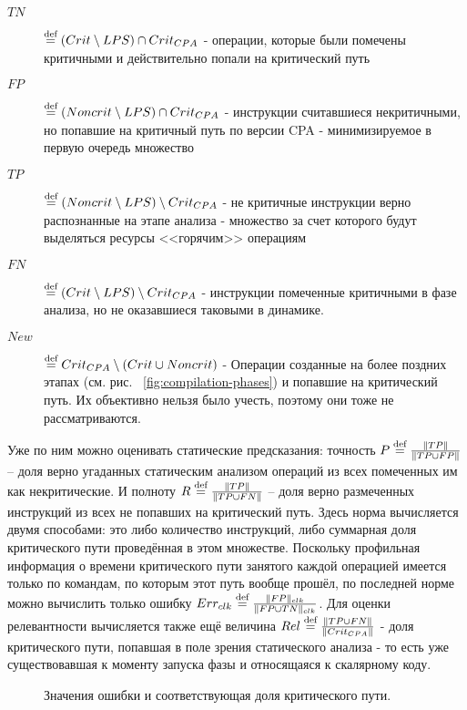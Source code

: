 \documentclass[a4paper,12pt,titlepage]{article}
\newcommand*{\fig}[1]{рис. ~{\ref{fig:#1}}}
\begin{document}
\begin{description}
	\item[$TN$] $\stackrel{\text{def}}{=} (Crit\setminus LPS)\cap Crit_{CPA}$ - операции, которые были помечены критичными и действительно попали на критический путь
	\item[$FP$] $\stackrel{\text{def}}{=} (Noncrit\setminus LPS)\cap Crit_{CPA}$ - инструкции считавшиеся некритичными, но попавшие на критичный путь по версии CPA - минимизируемое в первую очередь множество
	\item[$TP$] $\stackrel{\text{def}}{=} (Noncrit\setminus LPS)\setminus Crit_{CPA}$ - не критичные инструкции верно распознанные на этапе анализа - множество за счет которого будут выделяться ресурсы <<горячим>> операциям
	\item[$FN$] $\stackrel{\text{def}}{=} (Crit\setminus LPS)\setminus Crit_{CPA}$ - инструкции помеченные критичными в фазе анализа, но не оказавшиеся таковыми в динамике.
	\item[$New$] $\stackrel{\text{def}}{=} Crit_{CPA}\setminus (Crit \cup Noncrit)$ - Операции созданные на более поздних этапах (см. \fig{compilation-phases}) и попавшие на критический путь. Их объективно нельзя было учесть, поэтому они тоже не рассматриваются.
\end{description}
Уже по ним можно оценивать статические предсказания: точность $P\stackrel{\text{def}}{=}\frac{\parallel TP \parallel}{\parallel TP \cup FP \parallel}$ -- доля верно угаданных статическим анализом операций из всех помеченных им как некритические. И полноту $R\stackrel{\text{def}}{=}\frac{\parallel TP \parallel}{\parallel TP \cup FN \parallel}$ -- доля верно размеченных инструкций из всех не попавших на критический путь. Здесь норма вычисляется двумя способами: это либо количество инструкций, либо суммарная доля критического пути проведённая в этом множестве. Поскольку профильная информация о времени критического пути занятого каждой операцией имеется только по командам, по которым этот путь вообще прошёл, по последней норме можно вычислить только ошибку $Err_{clk}\stackrel{\text{def}}{=} \frac{\parallel FP \parallel_{clk}}{\parallel FP \cup TN \parallel_{clk}}$. Для оценки релевантности вычисляется также ещё величина $Rel\stackrel{\text{def}}{=}\frac{\parallel TP \cup FN\parallel}{\parallel Crit_{CPA} \parallel}$ - доля критического пути, попавшая в поле зрения статического анализа - то есть уже существовавшая к моменту запуска фазы и относящаяся к скалярному коду.
\begin{figure}[h]
\centering

\vspace{-1cm}
\caption{Значения ошибки и соответствующая доля критического пути.}
\label{fig:error-massive}
\end{figure}
\end{document}
